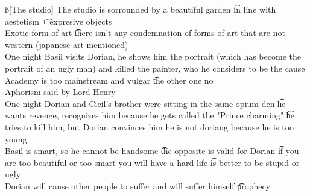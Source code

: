 \documentclass[12pt]{article}
\begin{document}
\ss[The studio]
The studio is sorrounded by a beautiful garden \t in line with aestetism \t + expresive objects \\
Exotic form of art \t there isn't any condemnation of forms of art that are not western (japanese art mentioned) \\
One night Basil visits Dorian, he shows him the portrait (which has become the portrait of an ugly man) and killed the painter, who he considers to be the cause \\
Academy is too mainstream and vulgar \t the other one no \\
Aphorism said by Lord Henry \\
One night Dorian and Cicil's brother were sitting in the same opium den \t he wants revenge, recognizes him because he gets called the "Prince charming" \t he tries to kill him, but Dorian convinces him he is not doriang because he is too young \\
Basil is smart, so he cannot be handsome \t the opposite is valid for Dorian \t if you are too beautiful or too smart you will have a hard life \t is better to be stupid or ugly \\
Dorian will cause other people to suffer and will suffer himself \t prophecy
\end{document}
